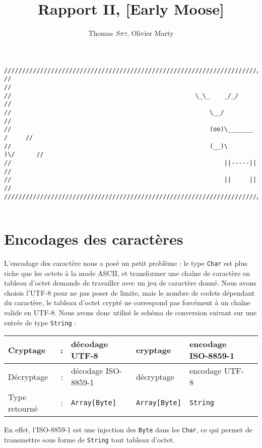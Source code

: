 \documentclass[11pt]{article} %
\title{Rapport II,  [Early Moose]}
\author{Thomas $S\pi\tau$, Olivier Marty}
\begin{document}
\maketitle

\begin{verbatim}
////////////////////////////////////////////////////////////////////////////////
//                                                                            //
//                                                   \_\_    _/_/             //
//                                                       \__/                 //
//                                                       (oo)\_______   /     //
//                                                       (__)\       )\/      //
//                                                           ||-----||        //
//                                                           ||     ||        //
////////////////////////////////////////////////////////////////////////////////  


\end{verbatim}

\section{Encodages des caractères}

L'encodage des caractère nous a posé un petit problème : le type \texttt{Char} est plus riche que les octets à la mode ASCII, et transformer une chaîne de caractère en tableau d'octet demande de travailler avec un jeu de caractère donné. Nous avons choisis l'UTF-8 pour ne pas poser de limite, mais le nombre de codets dépendant du caractère, le tableau d'octet crypté ne correspond pas forcément à un chaîne valide en UTF-8.
Nous avons donc utilisé le schéma de conversion suivant sur une entrée de type \texttt{String} :
\begin{center}
\begin{tabular}{|lr|l|l|l|l|}
  \hline
  Cryptage & : & décodage UTF-8 & cryptage & encodage ISO-8859-1 \\
  \hline
  Décryptage & : & décodage ISO-8859-1 & décryptage & encodage UTF-8 \\
  \hline
  Type retourné & : & \texttt{Array[Byte]} & \texttt{Array[Byte]} & \texttt{String}\\
  \hline
\end{tabular}
\end{center}


En effet, l'ISO-8859-1 est une injection des \texttt{Byte} dans les \texttt{Char}, ce qui permet de transmettre sous forme de \texttt{String} tout tableau d'octet.
\end{document}
